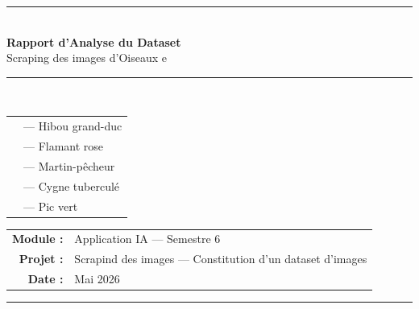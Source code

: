 \documentclass[12pt,a4paper]{article}
\begin{document}
\begin{titlepage}
  \centering
  \vspace*{2cm}

  {\color{primary}\rule{\linewidth}{2pt}}\\[0.4cm]

  {\Huge\bfseries\color{primary} Rapport d'Analyse du Dataset}\\[0.3cm]
  {\Large\color{accent} Scraping des images d'Oiseaux e}\\[0.2cm]

  {\color{primary}\rule{\linewidth}{2pt}}\\[1.5cm]

  \begin{tcolorbox}[
    colback=lightgray, colframe=accent, arc=6pt,
    title={\bfseries Espèces étudiées}, fonttitle=\color{white},
    coltitle=white, colbacktitle=accent
  ]
    \begin{center}
      \begin{tabular}{ll}
           & — Hibou grand-duc \\[2pt]
          & — Flamant rose \\[2pt]
        & — Martin-pêcheur \\[2pt]
          & — Cygne tuberculé \\[2pt]
           & — Pic vert \\
      \end{tabular}
    \end{center}
  \end{tcolorbox}

  \vfill

  \begin{tabular}{rl}
    \textbf{Module :}    & Application IA — Semestre 6 \\
    \textbf{Projet :}    & Scrapind des images — Constitution d'un dataset d'images \\
    \textbf{Date :}      & Mai 2026 \\
  \end{tabular}

  \vspace{1cm}
  {\color{primary}\rule{\linewidth}{1pt}}
\end{titlepage}

\tableofcontents
\newpage

\end{document}
